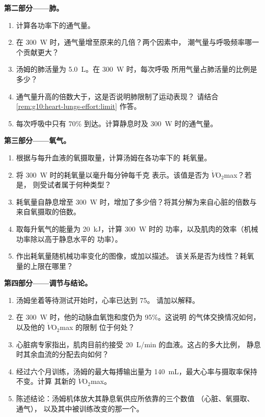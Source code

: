 \begin{problem}
\medskip
\noindent\textbf{第二部分——肺。}
\begin{enumerate}[resume]
  \item 计算各功率下的通气量。
  \item 在 \qty{300}{W} 时，通气量增至原来的几倍？两个因素中，
        潮气量与呼吸频率哪一个贡献更大？
  \item 汤姆的肺活量为 \qty{5.0}{L}。在 \qty{300}{W} 时，每次呼吸
        所用气量占肺活量的比例是多少？
  \item 通气量升高的倍数大于，这是否说明肺限制了运动表现？
        请结合
        \cref{rem:g10:heart-lungs-effort:limit} 作答。
  \item 每次呼吸中只有 70\% 到达。计算静息时及
        \qty{300}{W} 时的通气量。
\end{enumerate}

\medskip
\noindent\textbf{第三部分——氧气。}
\begin{enumerate}[resume]
  \item 根据与每升血液的氧摄取量，计算汤姆在各功率下的
        耗氧量。
  \item 将 \qty{300}{W} 时的耗氧量以毫升每分钟每千克
        表示。该值是否为 $\dot V\!\mathrm{O_2}$max？若是，
        则受试者属于何种类型？
  \item 耗氧量自静息增至
        \qty{300}{W} 时，增加了多少倍？将其分解为来自心脏的倍数与
        来自氧摄取的倍数。
  \item 取每升氧气的能量为 \qty{20}{kJ}，计算 \qty{300}{W} 时的
        功率，以及肌肉的效率（机械功率除以高于静息水平的
        功率）。
  \item 作出耗氧量随机械功率变化的图像，或加以描述。
        该关系是否为线性？耗氧量的上限在哪里？
\end{enumerate}

\medskip
\noindent\textbf{第四部分——调节与结论。}
\begin{enumerate}[resume]
  \item 汤姆坐着等待测试开始时，心率已达到 75。
        请加以解释。
  \item 在 \qty{300}{W} 时，他的动脉血氧饱和度仍为 95\%。这说明
        的气体交换情况如何，
        以及他的 $\dot V\!\mathrm{O_2}$max 的限制
        位于何处？
  \item 心脏病专家指出，肌肉目前约接受
        \qty{20}{L/min} 的血液。这占的多大比例，
        静息时其余血流的分配去向如何？
  \item 经过六个月训练，汤姆的最大每搏输出量为
        \qty{140}{mL}，最大心率与摄取率保持不变。计算
        其新的 $\dot V\!\mathrm{O_2}$max。
  \item 陈述结论：汤姆机体放大其静息氧供应所依靠的三个数值
        （心脏、氧摄取、通气），
        以及其中被训练改变的那一个。
\end{enumerate}
\end{problem}
